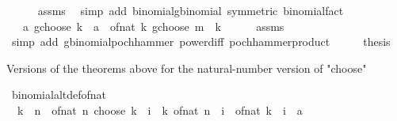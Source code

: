 \begin{isabellebody}
\ \ \ \ \isamarkupfalse%
\ assms\ \isamarkupfalse%
\ {\isacharparenleft}{\kern0pt}simp\ add{\isacharcolon}{\kern0pt}\ binomial{\isacharunderscore}{\kern0pt}gbinomial\ {\isacharbrackleft}{\kern0pt}symmetric{\isacharbrackright}{\kern0pt}\ binomial{\isacharunderscore}{\kern0pt}fact{\isacharparenright}{\kern0pt}\isanewline
\ \ \isamarkupfalse%
\ \isamarkupfalse%
\ {\isachardoublequoteopen}{\isasymdots}\ {\isacharequal}{\kern0pt}\ {\isacharparenleft}{\kern0pt}a\ gchoose\ k{\isacharparenright}{\kern0pt}\ {\isacharasterisk}{\kern0pt}\ {\isacharparenleft}{\kern0pt}a\ {\isacharminus}{\kern0pt}\ of{\isacharunderscore}{\kern0pt}nat\ k\ gchoose\ {\isacharparenleft}{\kern0pt}m\ {\isacharminus}{\kern0pt}\ k{\isacharparenright}{\kern0pt}{\isacharparenright}{\kern0pt}{\isachardoublequoteclose}\isanewline
\ \ \ \ \isamarkupfalse%
\ assms\ \isamarkupfalse%
\ {\isacharparenleft}{\kern0pt}simp\ add{\isacharcolon}{\kern0pt}\ gbinomial{\isacharunderscore}{\kern0pt}pochhammer\ power{\isacharunderscore}{\kern0pt}diff\ pochhammer{\isacharunderscore}{\kern0pt}product{\isacharparenright}{\kern0pt}\isanewline
\ \ \isamarkupfalse%
\ \isamarkupfalse%
\ {\isacharquery}{\kern0pt}thesis\ \isacommand{{\isachardot}{\kern0pt}}\isamarkupfalse%
\isanewline
{}\isamarkupfalse%
%
\endisatagproof
{\isafoldproof}%
%
\isadelimproof
%
\endisadelimproof
%
\begin{isamarkuptext}%
Versions of the theorems above for the natural-number version of "choose"%
\end{isamarkuptext}\isamarkuptrue%
\isamarkupfalse%
\ binomial{\isacharunderscore}{\kern0pt}altdef{\isacharunderscore}{\kern0pt}of{\isacharunderscore}{\kern0pt}nat{\isacharcolon}{\kern0pt}\isanewline
\ \ {\isachardoublequoteopen}k\ {\isasymle}\ n\ {\isasymLongrightarrow}\ of{\isacharunderscore}{\kern0pt}nat\ {\isacharparenleft}{\kern0pt}n\ choose\ k{\isacharparenright}{\kern0pt}\ {\isacharequal}{\kern0pt}\ {\isacharparenleft}{\kern0pt}{\isasymProd}i\ {\isacharequal}{\kern0pt}\ {}{\isachardot}{\kern0pt}{\isachardot}{\kern0pt}{\isacharless}{\kern0pt}k{\isachardot}{\kern0pt}\ of{\isacharunderscore}{\kern0pt}nat\ {\isacharparenleft}{\kern0pt}n\ {\isacharminus}{\kern0pt}\ i{\isacharparenright}{\kern0pt}\ {\isacharslash}{\kern0pt}\ of{\isacharunderscore}{\kern0pt}nat\ {\isacharparenleft}{\kern0pt}k\ {\isacharminus}{\kern0pt}\ i{\isacharparenright}{\kern0pt}\ {\isacharcolon}{\kern0pt}{\isacharcolon}{\kern0pt}\ {\isacharprime}{\kern0pt}a{\isacharparenright}{\kern0pt}{\isachardoublequoteclose}\isanewline

\end{isabellebody}
